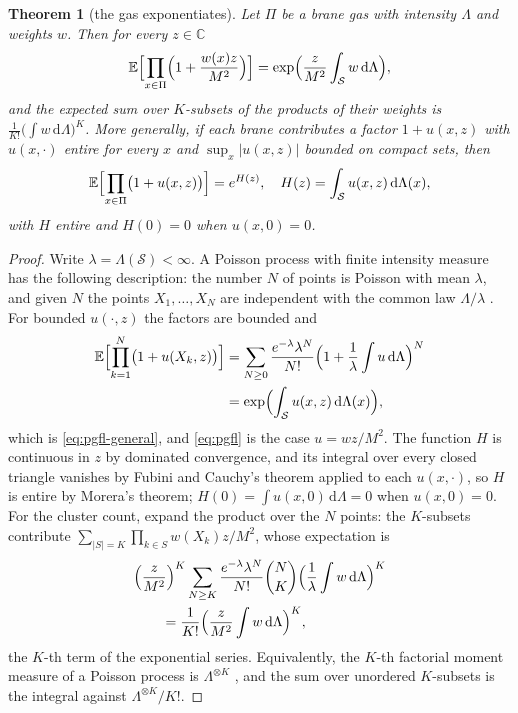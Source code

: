 \documentclass[aps,prd,10pt,twocolumn,superscriptaddress,nofootinbib,floatfix,longbibliography,showpacs,showkeys]{revtex4-2}
\theoremstyle{plain}
\newtheorem{theorem}{Theorem}
\theoremstyle{definition}
\theoremstyle{remark}
\newcommand{\bC}{\mathbb{C}}
\newcommand{\bE}{\mathbb{E}}
\newcommand{\dd}{\mathrm{d}}
\begin{document}
\begin{theorem}[the gas exponentiates]
\label{thm:poisson}
Let $\Pi$ be a brane gas with intensity $\Lambda$ and weights $w$. Then for every $z\in\bC$
\begin{equation}
\label{eq:pgfl}
\bE\Bigl[\prod_{x\in\Pi}\Bigl(1+\frac{w(x)z}{M^2}\Bigr)\Bigr]=\exp\Bigl(\frac{z}{M^2}\int_{\mathcal S}w\,\dd\Lambda\Bigr),
\end{equation}
and the expected sum over $K$-subsets of the products of their weights is $\frac{1}{K!}\bigl(\int w\,\dd\Lambda\bigr)^K$. More generally, if each brane contributes a factor $1+u(x,z)$ with $u(x,\cdot)$ entire for every $x$ and $\sup_x|u(x,z)|$ bounded on compact sets, then
\begin{equation}
\label{eq:pgfl-general}
\bE\Bigl[\prod_{x\in\Pi}\bigl(1+u(x,z)\bigr)\Bigr]=e^{H(z)},\quad H(z)=\int_{\mathcal S}u(x,z)\,\dd\Lambda(x),
\end{equation}
with $H$ entire and $H(0)=0$ when $u(x,0)=0$.
\end{theorem}

\begin{proof}
Write $\lambda=\Lambda(\mathcal S)<\infty$. A Poisson process with finite intensity measure has the following description: the number $N$ of points is Poisson with mean $\lambda$, and given $N$ the points $X_1,\dots,X_N$ are independent with the common law $\Lambda/\lambda$ \cite[Chapter~3]{LastPenrose2017}. For bounded $u(\cdot,z)$ the factors are bounded and
\begin{align*}
\bE\Bigl[\prod_{k=1}^{N}\bigl(1+u(X_k,z)\bigr)\Bigr]
&=\sum_{N\ge0}\frac{e^{-\lambda}\lambda^N}{N!}\Bigl(1+\frac1\lambda\int u\,\dd\Lambda\Bigr)^{N}\\
&=\exp\Bigl(\int_{\mathcal S}u(x,z)\,\dd\Lambda(x)\Bigr),
\end{align*}
which is \eqref{eq:pgfl-general}, and \eqref{eq:pgfl} is the case $u=wz/M^2$. The function $H$ is continuous in $z$ by dominated convergence, and its integral over every closed triangle vanishes by Fubini and Cauchy's theorem applied to each $u(x,\cdot)$, so $H$ is entire by Morera's theorem; $H(0)=\int u(x,0)\,\dd\Lambda=0$ when $u(x,0)=0$. For the cluster count, expand the product over the $N$ points: the $K$-subsets contribute $\sum_{|S|=K}\prod_{k\in S}w(X_k)z/M^2$, whose expectation is
\begin{align*}
&\Bigl(\frac{z}{M^2}\Bigr)^{K}\sum_{N\ge K}\frac{e^{-\lambda}\lambda^N}{N!}\binom NK\Bigl(\frac1\lambda\int w\,\dd\Lambda\Bigr)^{K}\\
&\qquad=\frac{1}{K!}\Bigl(\frac{z}{M^2}\int w\,\dd\Lambda\Bigr)^{K},
\end{align*}
the $K$-th term of the exponential series. Equivalently, the $K$-th factorial moment measure of a Poisson process is $\Lambda^{\otimes K}$ \cite[Chapter~4]{LastPenrose2017}, and the sum over unordered $K$-subsets is the integral against $\Lambda^{\otimes K}/K!$.
\end{proof}
\end{document}
